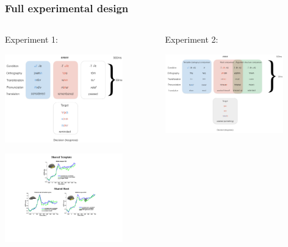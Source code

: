 \begin{frame}[noframenumbering] \footnotesize %
	\frametitle{Full experimental design}
	\begin{columns}[t]
		\begin{column}{0.5\textwidth} \centering
			Experiment 1: {\thif}
			
			\includegraphics[width=0.8\textwidth]{figs/fig2.pdf}
			\vfill
			
			\includegraphics[width=0.8\textwidth]{figs/fig4.pdf}		
		\end{column}
		\begin{column}{0.5\textwidth} \centering
			Experiment 2: {\tkal}
			
			\includegraphics[width=0.8\textwidth]{figs/fig5.001.jpeg}
			\bigskip
			

\end{column}
\end{columns}
\end{frame}
